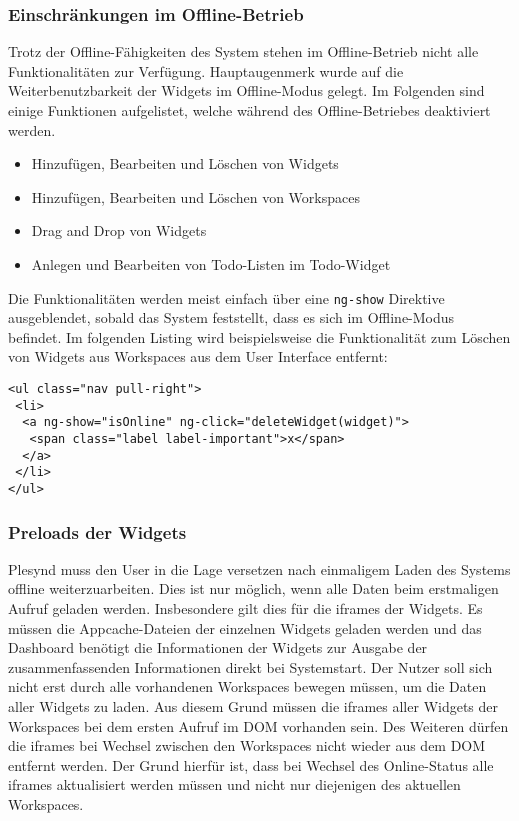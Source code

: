 \subsubsection*{Einschränkungen im Offline-Betrieb}
Trotz der Offline-Fähigkeiten des System stehen im Offline-Betrieb nicht alle Funktionalitäten zur Verfügung. Hauptaugenmerk wurde auf die Weiterbenutzbarkeit der Widgets im Offline-Modus gelegt. Im Folgenden sind einige Funktionen aufgelistet, welche während des Offline-Betriebes deaktiviert werden.
\begin{itemize}
 \item Hinzufügen, Bearbeiten und Löschen von Widgets
 \item Hinzufügen, Bearbeiten und Löschen von Workspaces
 \item Drag and Drop von Widgets
 \item Anlegen und Bearbeiten von Todo-Listen im Todo-Widget
\end{itemize}
 Die Funktionalitäten werden meist einfach über eine \texttt{ng-show} Direktive ausgeblendet, sobald das System feststellt, dass es sich im Offline-Modus befindet. Im folgenden Listing wird beispielsweise die Funktionalität zum Löschen von Widgets aus Workspaces aus dem User Interface entfernt:
\begin{lstlisting}
<ul class="nav pull-right">
 <li>
  <a ng-show="isOnline" ng-click="deleteWidget(widget)">
   <span class="label label-important">x</span>
  </a>
 </li>
</ul>
\end{lstlisting}

\subsubsection*{Preloads der Widgets}
Plesynd muss den User in die Lage versetzen nach einmaligem Laden des Systems offline weiterzuarbeiten. Dies ist nur möglich, wenn alle Daten beim erstmaligen Aufruf geladen werden. Insbesondere gilt dies für die iframes der Widgets. Es müssen die Appcache-Dateien der einzelnen Widgets geladen werden und das Dashboard benötigt die Informationen der Widgets zur Ausgabe der zusammenfassenden Informationen direkt bei Systemstart. Der Nutzer soll sich nicht erst durch alle vorhandenen Workspaces bewegen müssen, um die Daten aller Widgets zu laden. Aus diesem Grund müssen die iframes aller Widgets der Workspaces bei dem ersten Aufruf im DOM vorhanden sein. Des Weiteren dürfen die iframes bei Wechsel zwischen den Workspaces nicht wieder aus dem DOM entfernt werden. Der Grund hierfür ist, dass bei Wechsel des Online-Status alle iframes aktualisiert werden müssen und nicht nur diejenigen des aktuellen Workspaces.

